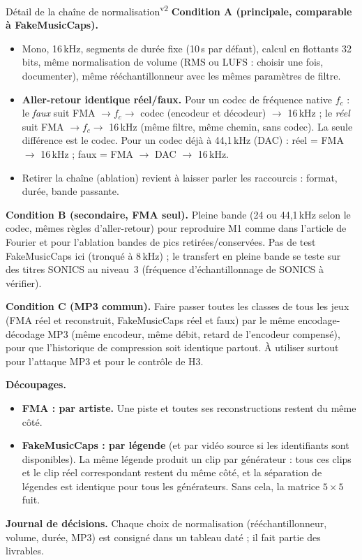 \documentclass[11pt,a4paper]{article}
\providecommand{\og}{\guillemotleft\nobreakspace}%
\providecommand{\fg}{\nobreakspace\guillemotright}}
\newcommand{\vtwot}{\textsuperscript{v2}}  %
\begin{document}
\begin{corr}{Détail de la chaîne de normalisation\vtwot}
\textbf{Condition A (principale, comparable à FakeMusicCaps).}
\begin{itemize}
\item Mono, 16\,kHz, segments de durée fixe (10\,s par défaut), calcul en flottants 32 bits, même normalisation de volume (RMS ou LUFS : choisir une fois, documenter), même rééchantillonneur avec les mêmes paramètres de filtre.
\item \textbf{Aller-retour identique réel/faux.} Pour un codec de fréquence native $f_c$ : le \emph{faux} suit FMA $\rightarrow f_c \rightarrow$ codec (encodeur et décodeur) $\rightarrow$ 16\,kHz ; le \emph{réel} suit FMA $\rightarrow f_c \rightarrow$ 16\,kHz (même filtre, même chemin, sans codec). La seule différence est le codec. Pour un codec déjà à 44,1\,kHz (DAC) : réel = FMA $\rightarrow$ 16\,kHz ; faux = FMA $\rightarrow$ DAC $\rightarrow$ 16\,kHz.
\item Retirer la chaîne (ablation) revient à laisser parler les raccourcis : format, durée, bande passante.
\end{itemize}
\textbf{Condition B (secondaire, FMA seul).} Pleine bande (24 ou 44,1\,kHz selon le codec, mêmes règles d'aller-retour) pour reproduire M1 comme dans l'article de Fourier et pour l'ablation \og{}bandes de pics retirées/conservées\fg{}. Pas de test FakeMusicCaps ici (tronqué à 8\,kHz) ; le transfert en pleine bande se teste sur des titres SONICS au niveau~3 (fréquence d'échantillonnage de SONICS à vérifier).

\textbf{Condition C (MP3 commun).} Faire passer toutes les classes de tous les jeux (FMA réel et reconstruit, FakeMusicCaps réel et faux) par le même encodage-décodage MP3 (même encodeur, même débit, retard de l'encodeur compensé), pour que l'historique de compression soit identique partout. À utiliser surtout pour l'attaque MP3 et pour le contrôle de H3.

\textbf{Découpages.}
\begin{itemize}
\item \textbf{FMA : par artiste.} Une piste et toutes ses reconstructions restent du même côté.
\item \textbf{FakeMusicCaps : par légende} (et par vidéo source si les identifiants sont disponibles). La même légende produit un clip par générateur : tous ces clips et le clip réel correspondant restent du même côté, et la séparation de légendes est identique pour tous les générateurs. Sans cela, la matrice $5\times5$ fuit.
\end{itemize}
\textbf{Journal de décisions.} Chaque choix de normalisation (rééchantillonneur, volume, durée, MP3) est consigné dans un tableau daté ; il fait partie des livrables.
\end{corr}
\end{document}
